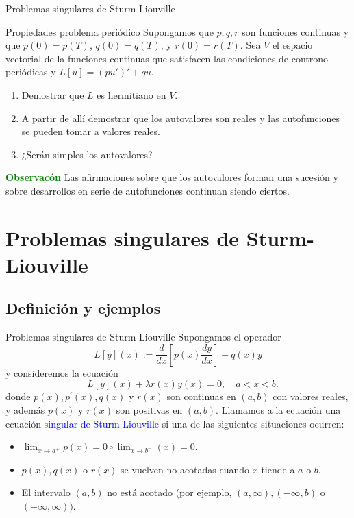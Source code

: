 \documentclass[xcolor=dvipsnames,a4paper,10pt,handout]{beamer}
\renewcommand{\emph}[1]{\textcolor{blue}{#1}}
\renewcommand{\textbf}[1]{\textcolor{green}{\bfseries #1}}
\begin{document}
 \begin{frame}{Problemas singulares de Sturm-Liouville}
\begin{block}{Propiedades problema periódico}
 Supongamos que $p,q,r$ son funciones continuas y que $p(0)=p(T)$, $q(0)=q(T)$, y $r(0)=r(T)$. Sea $V$ el espacio vectorial de la funciones continuas que satisfacen las condiciones de controno periódicas y $L[u]=(pu')'+qu$. 
 \begin{enumerate}
  \item Demostrar que $L$ es hermitiano en $V$.
  \item A partir de allí demostrar que los autovalores son reales y las autofunciones se pueden tomar a valores reales.
  \item ¿Serán simples los autovalores?
 \end{enumerate}
\end{block}

\textbf{Observacón} Las afirmaciones sobre que los autovalores forman una sucesión y  sobre desarrollos en serie de autofunciones continuan siendo ciertos. 

 
 
\end{frame}

 
 \section{Problemas singulares de Sturm-Liouville}
 
 \subsection{Definición y ejemplos}
\begin{frame}{Problemas singulares de Sturm-Liouville}
Supongamos el operador
$$L[y](x):=\frac{d}{d x}\left[p(x) \frac{d y}{d x}\right]+q(x) y$$
y consideremos la ecuación
 $$\quad L[y](x)+\lambda r(x) y(x)=0, \quad a<x<b.$$
donde  $p(x), p^{\prime}(x), q(x)$ y $r(x)$ son  continuas en $(a, b)$ con valores reales, y además $p(x)$ y $r(x)$ son positivas en $(a, b)$. Llamamos a la ecuación  una ecuación \emph{singular de Sturm-Liouville}  si una  de las siguientes situaciones ocurren:

\begin{itemize}
 \item<+-> $\lim _{x \to a^{+}} p(x)=0 \circ \lim _{x\to b^-}(x)=0$.
 \item<+-> $p(x), q(x)$ o $r(x)$ se vuelven no acotadas cuando $x$ tiende a $a$ o $b$.
 \item<+-> El intervalo $(a, b)$ no está acotado (por ejemplo, $(a, \infty),(-\infty, b)$ o $(-\infty, \infty))$.
\end{itemize}


\end{frame}
\end{document}
